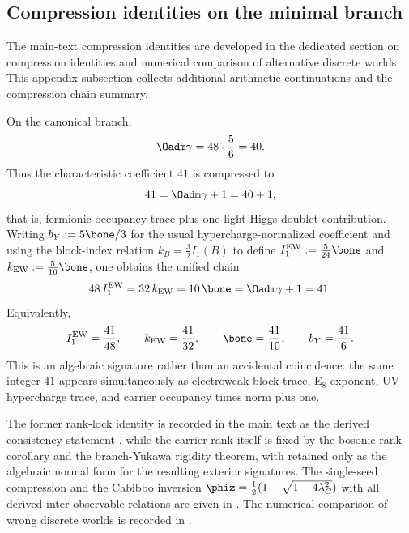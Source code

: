 \subsection{Compression identities on the minimal branch}

The main-text compression identities are developed in the dedicated section on compression identities
and numerical comparison of alternative discrete worlds. This appendix subsection collects
additional arithmetic continuations and the compression chain summary.

\begin{remark}
On the canonical branch,
\[
\Oadm\gamma=48\cdot\frac56=40.
\]
Thus the characteristic coefficient $41$ is compressed to
\[
41=\Oadm\gamma+1=40+1,
\]
that is, fermionic occupancy trace plus one light Higgs doublet contribution.
Writing $b_Y:=5\bone/3$ for the usual hypercharge-normalized coefficient and using the block-index relation $k_B=\frac32 I_1(B)$ to define $I_1^{\mathrm{EW}}:=\frac{5}{24}\bone$ and $k_{\mathrm{EW}}:=\frac{5}{16}\bone$, one obtains the unified chain
\begin{equation}
\label{eq:41-chain}
48\,I_1^{\mathrm{EW}}
=32\,k_{\mathrm{EW}}
=10\,\bone
=\Oadm\gamma+1
=41.
\end{equation}
Equivalently,
\[
I_1^{\mathrm{EW}}=\frac{41}{48},
\qquad
k_{\mathrm{EW}}=\frac{41}{32},
\qquad
\bone=\frac{41}{10},
\qquad
b_Y=\frac{41}{6}.
\]
This is an algebraic signature rather than an accidental coincidence: the same integer $41$ appears simultaneously as electroweak block trace, E$_8$ exponent, UV hypercharge trace, and carrier occupancy times norm plus one.
\end{remark}

\begin{remark}
The former rank-lock identity is recorded in the main text as the derived consistency statement
, while the carrier rank itself is fixed by the bosonic-rank corollary and the
branch-Yukawa rigidity theorem, with  retained only as the
algebraic normal form for the resulting exterior signatures.
The single-seed compression and the Cabibbo inversion $\phiz=\frac12(1-\sqrt{1-4\lambda_C^2})$
with all derived inter-observable relations are given in
. The numerical
comparison of wrong discrete worlds is recorded in .
\end{remark}

